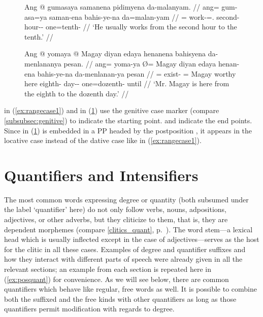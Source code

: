 \begin{figure}[h]
\pex\label{ex:rangecase}
\a\label{ex:rangecase1}\begingl
	\gla Ang @ gumasaya samanena pidimyena da-malanyam. //
	\glb ang= gum-asa=ya saman-ena bahis-ye-na da=malan-yam //
	\glc \AgtT{}= work-\Hab{}=\TsgM{}.\Top{} second-\Gen{} hour-\Pl{}-\Gen{} 
		one=tenth-\Dat{} //
	\glft `He usually works from the second hour to the tenth.' //
\endgl

\a\label{ex:rangecase2}\begingl
	\gla Ang @ yomaya {} @ Magay diyan edaya henanena bahisyena da-menlananya 
		pesan. //
	\glb ang= yoma-ya Ø= Magay diyan edaya henan-ena bahis-ye-na 
		da-menlanan-ya pesan //
	\glc \AgtT{}= exist-\TsgM{} \Top{}= Magay worthy here eighth-\Gen{} 
		day-\Pl{}-\Gen{} one=dozenth-\Loc{} until //
	\glft `Mr. Magay is here from the eighth to the dozenth day.' //
\endgl
\xe
\end{figure}

 in (\ref{ex:rangecase1}) and
 in (\ref{ex:rangecase2}) use the
genitive case marker  (compare \autoref{subsubsec:genitive}) to
indicate the starting point.  and
 indicate 
the end points. Since  in (\ref{ex:rangecase2}) is 
embedded in a PP headed by the postposition , it appears in 
the locative case instead of the dative case like  in 
(\ref{ex:rangecase1}).


\section{Quantifiers and Intensifiers}
\label{sec:quantifiers}

The most common words expressing degree or quantity (both subsumed under the
label `quantifier' here) do not only follow verbs, nouns, adpositions,
adjectives, or other adverbs, but they cliticize to them, that is, they are
dependent morphemes (compare \autoref{clitics_quant},
p.~\pageref{clitics_quant}). The word stem---a lexical head which is usually
inflected except in the case of adjectives---serves as the host for the clitic
in all these cases. Examples of degree and quantifier suffixes and how they
interact with different parts of speech were already given in all the relevant
sections; an example from each section is repeated here in (\ref{ex:posquant})
for convenience. As we will see below, there are common quantifiers which
behave like regular, free words as well. It is possible to combine both the
suffixed and the free kinds with other quantifiers as long as those quantifiers
permit modification with regards to degree.

